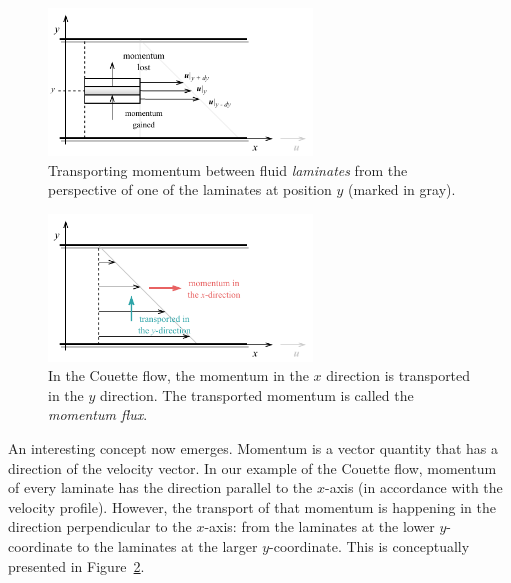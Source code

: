 \documentclass[10pt,twocolumn]{article}
\begin{document}
\begin{figure}[H]
\centering\includegraphics[width=7cm]{momentum-transport-in-laminates.pdf}
\caption{Transporting momentum between fluid \textit{laminates} from the perspective of one of the laminates at position $y$ (marked in gray).}
\label{fig:momentum-transport-in-laminates}
\end{figure}
\begin{figure}[H]
\centering\includegraphics[width=7cm]{couette-flow-momentum-transport.pdf}
\caption{In the Couette flow, the momentum in the $x$ direction is transported in the $y$ direction. The transported momentum is called the \textit{momentum flux}.}
\label{fig:couette-flow-momentum-transport}
\end{figure}
An interesting concept now emerges. Momentum is a vector quantity that has a direction of the velocity vector. In our example of the Couette flow, momentum of every laminate has the direction parallel to the $x$-axis (in accordance with the velocity profile). However, the transport of that momentum is happening in the direction perpendicular to the $x$-axis: from the laminates at the lower $y$-coordinate to the laminates at the larger $y$-coordinate. This is conceptually presented in Figure~\ref{fig:couette-flow-momentum-transport}. 
\end{document}
